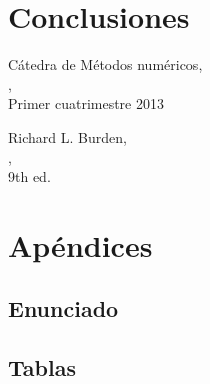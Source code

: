\documentclass[%
	compressed,
	titlepage,
	narroweqnarray,
	inline,
	twoside,
	]{ieee}
\begin{document}


\section{Conclusiones}




\begin{thebibliography}{1}

	C\'atedra de M\'etodos num\'ericos,\\
	,\\
	\newblock Primer cuatrimestre 2013

	Richard L. Burden, \\
	, \\
	\newblock 9th ed.

\end{thebibliography}


\newpage

\section{Ap\'endices}

\subsection{Enunciado}


\newpage



\newpage

\subsection{Tablas}


\end{document}
